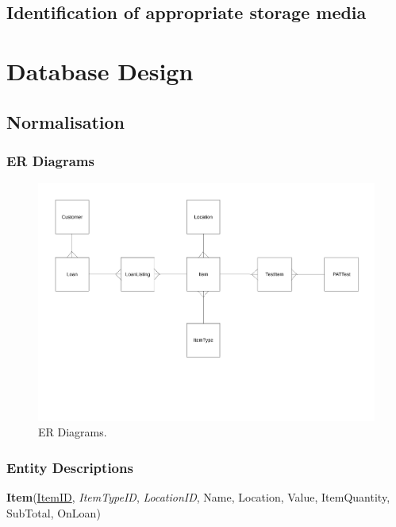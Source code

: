 \subsection{Identification of appropriate storage media}

\section{Database Design}

\subsection{Normalisation}

\newpage

\begin{landscape}

\subsubsection{ER Diagrams}

\begin{figure}[H]
    \centerline{\includegraphics[width=600px]{./Design/ER_Diagrams/ER_Diagram.pdf}}
    \caption{ER Diagrams.} \label{fig:ER Diagrams}
\end{figure}

\end{landscape}

\subsubsection{Entity Descriptions}

\noindent \textbf{Item}(\underline{ItemID}, \emph{ItemTypeID}, \emph{LocationID}, Name, Location, Value, ItemQuantity, SubTotal, OnLoan)\\


